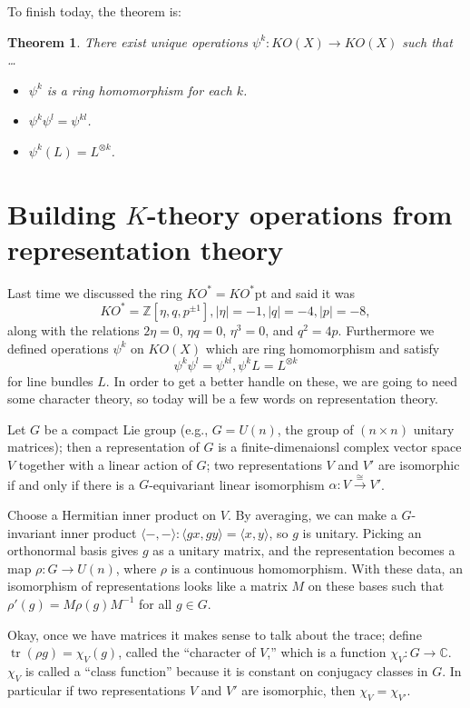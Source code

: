 \documentclass{article}
\newcommand{\Z}{\mathbb{Z}}
\newcommand{\C}{\mathbb{C}}
\newcommand{\ptspace}{\mathrm{pt}}
\DeclareMathOperator{\tr}{tr}
\newtheorem{thm}{Theorem}[section]
\begin{document}
To finish today, the theorem is:
\begin{thm}
There exist unique operations $\psi^k: KO(X) \to KO(X)$ such that \ldots
\begin{itemize}
\item $\psi^k$ is a ring homomorphism for each $k$.
\item $\psi^k \psi^l = \psi^{kl}$.
\item $\psi^k(L) = L^{\otimes k}$.
\end{itemize}
\end{thm}


\section{Building $K$-theory operations from representation theory} %

Last time we discussed the ring $KO^* = KO^* \ptspace$ and said it was
\[
KO^* = \Z[\eta, q, p^{\pm 1}], |\eta| = -1, |q| = -4, |p| = -8
,\]
along with the relations $2 \eta = 0$, $\eta q = 0$, $\eta^3 = 0$, and $q^2 = 4p$.  Furthermore we defined operations $\psi^k$ on $KO(X)$ which are ring homomorphism and satisfy
\[
\psi^k \psi^l = \psi^{kl}, \psi^k L = L^{\otimes k}
\]
for line bundles $L$.  In order to get a better handle on these, we are going to need some character theory, so today will be a few words on representation theory.

Let $G$ be a compact Lie group (e.g., $G = U(n)$, the group of $(n \times n)$ unitary matrices); then a representation of $G$ is a finite-dimenaionsl complex vector space $V$ together with a linear action of $G$; two representations $V$ and $V'$ are isomorphic if and only if there is a $G$-equivariant linear isomorphism $\alpha: V \stackrel{\cong}{\to} V'$.

Choose a Hermitian inner product on $V$.  By averaging, we can make a $G$-invariant inner product $\langle - , - \rangle: \langle gx, gy \rangle = \langle x, y \rangle$, so $g$ is unitary.  Picking an orthonormal basis gives $g$ as a unitary matrix, and the representation becomes a map $\rho: G \to U(n)$, where $\rho$ is a continuous homomorphism.  With these data, an isomorphism of representations looks like a matrix $M$ on these bases such that $\rho'(g) = M \rho(g) M^{-1}$ for all $g \in G$.

Okay, once we have matrices it makes sense to talk about the trace; define $\tr(\rho g) = \chi_V(g)$, called the ``character of $V$,'' which is a function $\chi_V: G \to \C$.  $\chi_V$ is called a ``class function'' because it is constant on conjugacy classes in $G$.  In particular if two representations $V$ and $V'$ are isomorphic, then $\chi_V = \chi_{V'}$.
\end{document}
